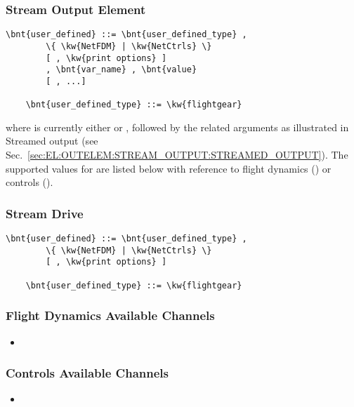 \subsubsection{Stream Output Element}
\begin{Verbatim}[commandchars=\\\{\}]
    \bnt{user_defined} ::= \bnt{user_defined_type} , 
        \{ \kw{NetFDM} | \kw{NetCtrls} \}
        [ , \kw{print options} ]
        , \bnt{var_name} , \bnt{value}
        [ , ...]

    \bnt{user_defined_type} ::= \kw{flightgear}
\end{Verbatim}
where  is currently either  or , followed by the related arguments
as illustrated in Streamed output (see Sec.~\ref{sec:EL:OUTELEM:STREAM_OUTPUT:STREAMED_OUTPUT}).
The supported values for  are listed below with reference to flight dynamics ()
or controls ().

\subsubsection{Stream Drive}
\begin{Verbatim}[commandchars=\\\{\}]
    \bnt{user_defined} ::= \bnt{user_defined_type} ,
        \{ \kw{NetFDM} | \kw{NetCtrls} \}
        [ , \kw{print options} ]

    \bnt{user_defined_type} ::= \kw{flightgear}
\end{Verbatim}

\subsubsection{Flight Dynamics Available Channels}
\begin{itemize}
\item
\end{itemize}


\subsubsection{Controls Available Channels}
\begin{itemize}
\item
\end{itemize}


